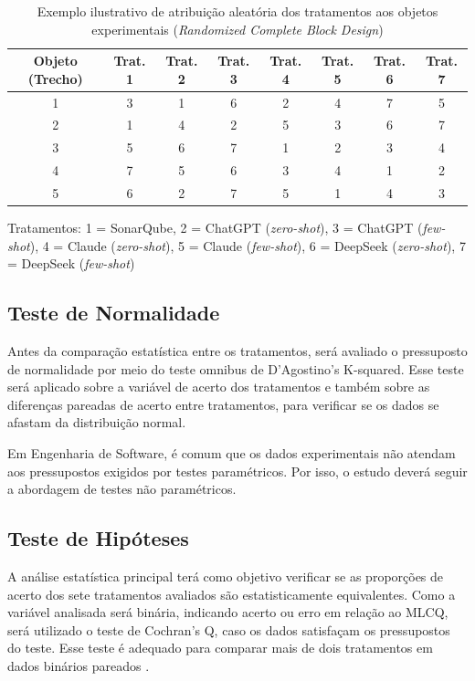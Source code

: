 \begin{table}[H]
\centering
\caption{Exemplo ilustrativo de atribuição aleatória dos tratamentos aos objetos experimentais (\textit{Randomized Complete Block Design}) }
\label{tab:rcbd-exemplo}
\begin{tabular}{c|c c c c c c c}
\hline
\textbf{Objeto (Trecho)} & \textbf{Trat. 1} & \textbf{Trat. 2} & \textbf{Trat. 3} & \textbf{Trat. 4} & \textbf{Trat. 5} & \textbf{Trat. 6} & \textbf{Trat. 7} \\
\hline
1 & 3 & 1 & 6 & 2 & 4 & 7 & 5\\
2 & 1 & 4 & 2 & 5 & 3 & 6 & 7\\
3 & 5 & 6 & 7 & 1 & 2 & 3 & 4\\
4 & 7 & 5 & 6 & 3 & 4 & 1 & 2\\
5 & 6 & 2 & 7 & 5 & 1 & 4 & 3\\
\hline
\end{tabular}

\vspace{0.3em}
\small{Tratamentos: 1 = SonarQube, 2 = ChatGPT (\textit{zero-shot}), 3 = ChatGPT (\textit{few-shot}), 4 = Claude (\textit{zero-shot}), 5 = Claude (\textit{few-shot}), 6 = DeepSeek (\textit{zero-shot}), 7 = DeepSeek (\textit{few-shot})}
\end{table}


\subsection{Teste de Normalidade}

Antes da comparação estatística entre os tratamentos, será avaliado o pressuposto de normalidade por meio do teste omnibus de D’Agostino’s K-squared.
Esse teste será aplicado sobre a variável de acerto dos tratamentos e também sobre as diferenças pareadas de acerto entre tratamentos, para verificar
se os dados se afastam da distribuição normal.

Em Engenharia de Software, é comum que os dados experimentais não atendam aos pressupostos exigidos por testes paramétricos. Por isso, o estudo
deverá seguir a abordagem de testes não paramétricos.

\subsection{Teste de Hipóteses}

A análise estatística principal terá como objetivo verificar se as proporções de acerto dos sete tratamentos avaliados são estatisticamente equivalentes.
Como a variável analisada será binária, indicando acerto ou erro em relação ao MLCQ, será utilizado o teste de Cochran's Q, caso os dados satisfaçam os pressupostos do teste. Esse teste é adequado para comparar mais de dois tratamentos em dados
binários pareados \cite{conover1999practical}.


